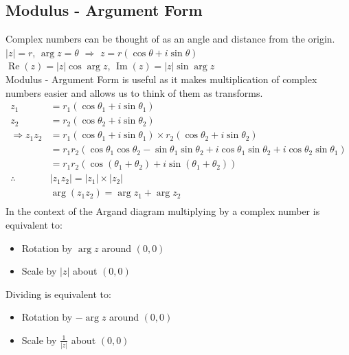 \documentclass[class=article, crop=false]{standalone}
\begin{document}
\subsection*{Modulus - Argument Form}
Complex numbers can be thought of as an angle and distance from the origin. \\
$|z| = r$, $\arg z = \theta$ $\Rightarrow$ $z = r(\cos \theta + i \sin \theta)$ \\
$\operatorname{Re}(z) = |z| \cos \arg z$, $\operatorname{Im}(z) = |z| \sin \arg z$ \\
Modulus - Argument Form is useful as it makes multiplication of complex numbers easier and allows us to think of them as transforms. \\
\begin{align*}
z_1 & = r_1(\cos \theta_1 + i \sin \theta_1) \\
z_2 & = r_2(\cos \theta_2 + i \sin \theta_2) \\
\Rightarrow z_1 z_2 & = r_1(\cos \theta_1 + i \sin \theta_1) \times r_2(\cos \theta_2 + i \sin \theta_2) \\
& = r_1 r_2(\cos \theta_1 \cos \theta_2 - \sin \theta_1 \sin \theta_2 + i \cos \theta_1 \sin \theta_2 + i \cos \theta_2 \sin \theta_1) \\
& = r_1 r_2(\cos(\theta_1 + \theta_2) + i \sin(\theta_1 + \theta_2)) \\
\therefore & |z_1 z_2| = |z_1| \times |z_2| \\
& \arg(z_1 z_2) = \arg z_1 + \arg z_2 \\
\end{align*}
In the context of the Argand diagram multiplying by a complex number is equivalent to:
\begin{itemize}
	\item Rotation by $\arg z$ around $(0,0)$
	\item Scale by $|z|$ about $(0,0)$
\end{itemize} 
Dividing is equivalent to:
\begin{itemize}
	\item Rotation by $- \arg z$ around $(0,0)$
	\item Scale by $\frac{1}{|z|}$ about $(0,0)$
\end{itemize} 
\end{document}
